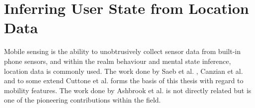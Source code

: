 \section{Inferring User State from Location Data}





Mobile sensing is the ability to unobtrusively collect sensor data from built-in phone sensors, and within the realm behaviour and mental state inference, location data is commonly used. The work done by Saeb et al. \cite{Saeb2015}, Canzian et al. \cite{Canzian2015}  and to some extend Cuttone et al. \cite{sparse-location-2014} forms the basis of this thesis with regard to mobility features. The work done by Ashbrook et al. \cite{learning_significant_locations} is not directly related but is one of the pioneering contributions within the field.\\

